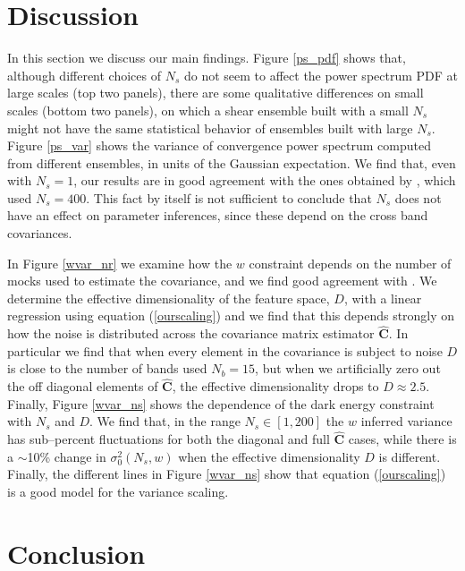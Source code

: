 \documentclass[reprint,aps,prd,superscriptaddress,showkeys,showpacs]{revtex4-1}
\newcommand{\bbh}[1]{\mathbf{\hat{#1}}}
\begin{document}

\section{Discussion}

In this section we discuss our main findings. Figure \ref{ps_pdf} shows that, although different choices of $N_s$ do not seem to affect the power spectrum PDF at large scales (top two panels), there are some qualitative differences on small scales (bottom two panels), on which a shear ensemble built with a small $N_s$ might not have the same statistical behavior of ensembles built with large $N_s$. Figure \ref{ps_var} shows the variance of convergence power spectrum computed from different ensembles, in units of the Gaussian expectation. We find that, even with $N_s=1$, our results are in good agreement with the ones obtained by \citep{Sato12}, which used $N_s=400$. This fact by itself is not sufficient to conclude that $N_s$ does not have an effect on parameter inferences, since these depend on the cross band covariances. 

In Figure \ref{wvar_nr} we examine how the $w$ constraint depends on the number of mocks used to estimate the covariance, and we find good agreement with \citep{DodelsonSchneider13}. We determine the effective dimensionality of the feature space, $D$, with a linear regression using equation (\ref{ourscaling}) and we find that this depends strongly on how the noise is distributed across the covariance matrix estimator $\bbh{C}$. In particular we find that when every element in the covariance is subject to noise $D$ is close to the number of bands used $N_b=15$, but when we artificially zero out the off diagonal elements of $\bbh{C}$, the effective dimensionality drops to $D\approx2.5$. Finally, Figure \ref{wvar_ns} shows the dependence of the dark energy constraint with $N_s$ and $D$. We find that, in the range $N_s\in[1,200]$ the $w$ inferred variance has sub--percent fluctuations for both the diagonal and full $\bbh{C}$ cases, while there is a $\sim$10\% change in $\sigma^2_0(N_s,w)$ when the effective dimensionality $D$ is different. Finally, the different lines in Figure \ref{wvar_ns} show that equation (\ref{ourscaling}) is a good model for the variance scaling. 


\section{Conclusion}
\end{document}
